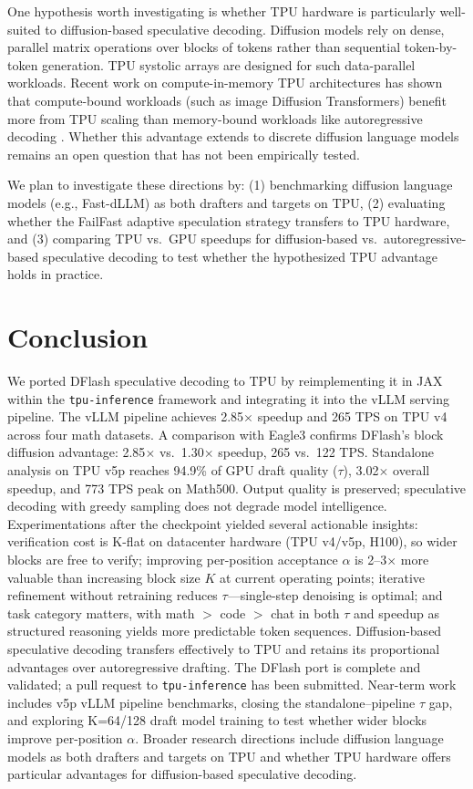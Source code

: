 \documentclass[12pt,letterpaper]{article}
\begin{document}
One hypothesis worth investigating is whether TPU hardware is particularly well-suited to diffusion-based speculative decoding. Diffusion models rely on dense, parallel matrix operations over blocks of tokens rather than sequential token-by-token generation. TPU systolic arrays are designed for such data-parallel workloads. Recent work on compute-in-memory TPU architectures has shown that compute-bound workloads (such as image Diffusion Transformers) benefit more from TPU scaling than memory-bound workloads like autoregressive decoding \citep{wang2025acceleratinglargelanguagemodel}. Whether this advantage extends to discrete diffusion language models remains an open question that has not been empirically tested.

We plan to investigate these directions by: (1) benchmarking diffusion language models (e.g., Fast-dLLM) as both drafters and targets on TPU, (2) evaluating whether the FailFast adaptive speculation strategy transfers to TPU hardware, and (3) comparing TPU vs.\ GPU speedups for diffusion-based vs.\ autoregressive-based speculative decoding to test whether the hypothesized TPU advantage holds in practice.

\section{Conclusion}

We ported DFlash speculative decoding to TPU by reimplementing it in JAX within the \texttt{tpu-inference} framework and integrating it into the vLLM serving pipeline. The vLLM pipeline achieves 2.85$\times$ speedup and 265 TPS on TPU v4 across four math datasets. A comparison with Eagle3 confirms DFlash's block diffusion advantage: 2.85$\times$ vs.\ 1.30$\times$ speedup, 265 vs.\ 122 TPS. Standalone analysis on TPU v5p reaches 94.9\% of GPU draft quality ($\tau$), 3.02$\times$ overall speedup, and 773 TPS peak on Math500. Output quality is preserved; speculative decoding with greedy sampling does not degrade model intelligence. Experimentations after the checkpoint yielded several actionable insights: verification cost is K-flat on datacenter hardware (TPU v4/v5p, H100), so wider blocks are free to verify; improving per-position acceptance $\alpha$ is 2--3$\times$ more valuable than increasing block size $K$ at current operating points; iterative refinement without retraining reduces $\tau$---single-step denoising is optimal; and task category matters, with math $>$ code $>$ chat in both $\tau$ and speedup as structured reasoning yields more predictable token sequences. Diffusion-based speculative decoding transfers effectively to TPU and retains its proportional advantages over autoregressive drafting. The DFlash port is complete and validated; a pull request to \texttt{tpu-inference} has been submitted. Near-term work includes v5p vLLM pipeline benchmarks, closing the standalone--pipeline $\tau$ gap, and exploring K=64/128 draft model training to test whether wider blocks improve per-position $\alpha$. Broader research directions include diffusion language models as both drafters and targets on TPU and whether TPU hardware offers particular advantages for diffusion-based speculative decoding.
\end{document}
